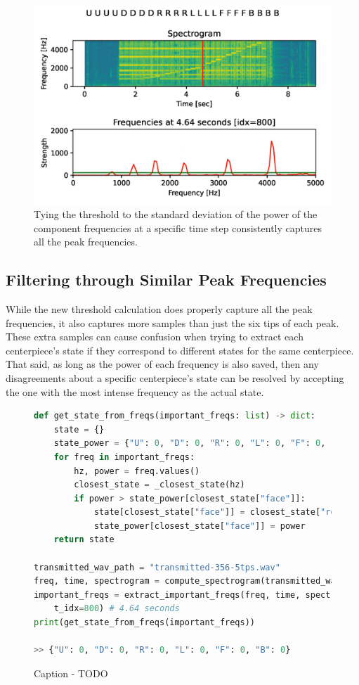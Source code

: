 \begin{figure}[h]
    \centering
    \includegraphics[width=0.8\linewidth]{Figures/5 Algorithm Design/threshold-refined.png}
    \caption{Tying the threshold to the standard deviation of the power of the component frequencies at a specific time step consistently captures all the peak frequencies.}
    \label{fig:threshold-refined}
\end{figure}

\subsection{Filtering through Similar Peak Frequencies}
\label{subsec:filtering-similar-peak-frequencies}
While the new threshold calculation does properly capture all the peak frequencies, it also captures more samples than just the six tips of each peak. 
These extra samples can cause confusion when trying to extract each centerpiece's state if they correspond to different states for the same centerpiece.
That said, as long as the power of each frequency is also saved, then any disagreements about a specific centerpiece's state can be resolved by accepting the one with the most intense frequency as the actual state.

\begin{figure}[h]
\begin{lstlisting}[language=Python]
def get_state_from_freqs(important_freqs: list) -> dict:
    state = {}
    state_power = {"U": 0, "D": 0, "R": 0, "L": 0, "F": 0, "B": 0}  # New
    for freq in important_freqs:
        hz, power = freq.values()
        closest_state = _closest_state(hz)
        if power > state_power[closest_state["face"]]:              # New
            state[closest_state["face"]] = closest_state["rotation"]
            state_power[closest_state["face"]] = power              # New
    return state

transmitted_wav_path = "transmitted-356-5tps.wav"
freq, time, spectrogram = compute_spectrogram(transmitted_wav_path)
important_freqs = extract_important_freqs(freq, time, spectrogram,
    t_idx=800) # 4.64 seconds
print(get_state_from_freqs(important_freqs))

>> {"U": 0, "D": 0, "R": 0, "L": 0, "F": 0, "B": 0}
\end{lstlisting}
\caption{Caption - TODO}
\label{fig:todo}
\end{figure}

